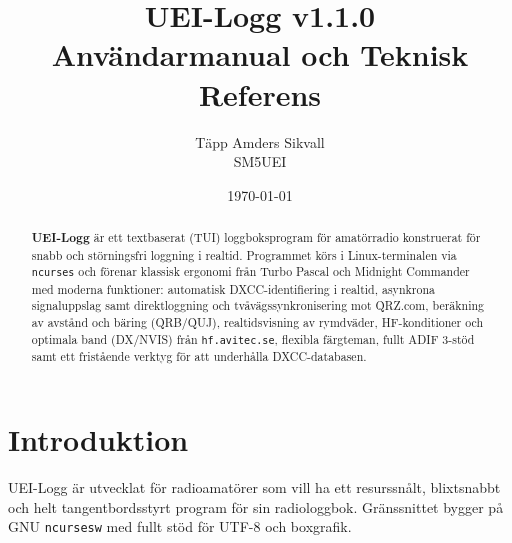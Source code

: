 \documentclass[11pt,a4paper]{article}
\title{
    \vspace{-1cm}
    \LARGE\textbf{UEI-Logg v1.1.0}\\[0.3cm]
    \large Användarmanual och Teknisk Referens
}
\author{Täpp Amders Sikvall\\ SM5UEI}
\date{\today}
\begin{document}
\maketitle
\thispagestyle{empty}

\begin{abstract}
\noindent\textbf{UEI-Logg} är ett textbaserat (TUI) loggboksprogram för amatörradio konstruerat för snabb och störningsfri loggning i realtid. Programmet körs i Linux-terminalen via \texttt{ncurses} och förenar klassisk ergonomi från Turbo Pascal och Midnight Commander med moderna funktioner: automatisk DXCC-identifiering i realtid, asynkrona signaluppslag samt direktloggning och tvåvägssynkronisering mot QRZ.com, beräkning av avstånd och bäring (QRB/QUJ), realtidsvisning av rymdväder, HF-konditioner och optimala band (DX/NVIS) från \texttt{hf.avitec.se}, flexibla färgteman, fullt ADIF 3-stöd samt ett fristående verktyg för att underhålla DXCC-databasen.
\end{abstract}

\vspace{0.5cm}
\tableofcontents
\newpage

\section{Introduktion}
\label{sec:intro}

UEI-Logg är utvecklat för radioamatörer som vill ha ett resurssnålt, blixtsnabbt och helt tangentbordsstyrt program för sin radiologgbok. Gränssnittet bygger på GNU \texttt{ncursesw} med fullt stöd för UTF-8 och boxgrafik.
\end{document}

